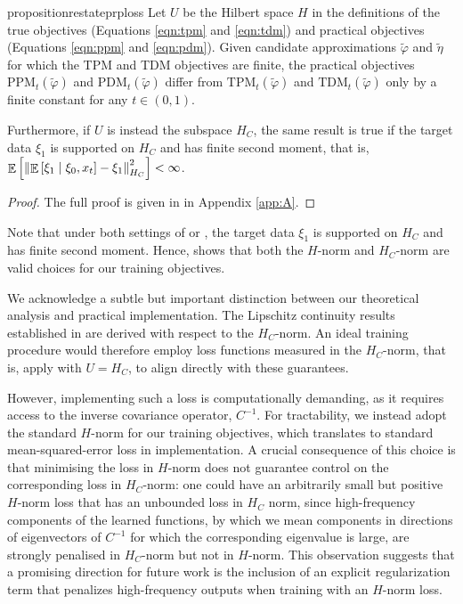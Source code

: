 \begin{restatable}{proposition}{restateprploss}\label{prp:loss}
  Let \(U\) be the Hilbert space \(H\) in the definitions of the true objectives (Equations \ref{eqn:tpm} and \ref{eqn:tdm}) and practical objectives (Equations \ref{eqn:ppm} and \ref{eqn:pdm}). Given candidate approximations \(\widetilde{\varphi}\) and \(\widetilde{\eta}\) for which the TPM and TDM objectives are finite, the practical objectives \(\mathrm{PPM}_{t}(\widetilde{\varphi})\) and \(\mathrm{PDM}_{t}(\widetilde{\varphi})\) differ from \(\mathrm{TPM}_{t}(\widetilde{\varphi})\) and \(\mathrm{TDM}_{t}(\widetilde{\varphi})\) only by a finite constant for any \(t \in (0, 1)\).

  Furthermore, if \(U\) is instead the subspace \(H_{C}\), the same result is true if the target data \(\xi_{1}\) is supported on \(H_{C}\) and has finite second moment, that is, \( \mathop{\mathbb{E}}\qty[\norm{\mathop{\mathbb{E}}\qty[\xi_{1} \mid \xi_{0}, x_{t}] - \xi_{1}}_{H_{C}}^{2}] < \infty\).
\end{restatable}
\begin{proof}
  The full proof is given in  in Appendix \ref{app:A}.
\end{proof}


Note that under both settings of  or , the target data \(\xi_{1}\) is supported on \(H_{C}\) and has finite second moment. Hence,  shows that both the \(H\)-norm and \(H_{C}\)-norm are valid choices for our training objectives.

We acknowledge a subtle but important distinction between our theoretical analysis and practical implementation. The Lipschitz continuity results established in  are derived with respect to the \(H_{C}\)-norm. An ideal training procedure would therefore employ loss functions measured in the \(H_{C}\)-norm, that is, apply  with \(U = H_{C}\), to align directly with these guarantees.

However, implementing such a loss is computationally demanding, as it requires access to the inverse covariance operator, \(C^{-1}\). For tractability, we instead adopt the standard \(H\)-norm for our training objectives, which translates to standard mean-squared-error loss in implementation. A crucial consequence of this choice is that minimising the loss in \(H\)-norm does not guarantee control on the corresponding loss in \(H_{C}\)-norm: one could have an arbitrarily small but positive \(H\)-norm loss that has an unbounded loss in \(H_{C}\) norm, since  high-frequency components of the learned functions, by which we mean components in directions of eigenvectors of \(C^{-1}\) for which the corresponding eigenvalue is large, are strongly penalised in \(H_{C}\)-norm  but not in \(H\)-norm. This observation suggests that a promising direction for future work is the inclusion of an explicit regularization term that penalizes high-frequency outputs when training with an \(H\)-norm loss.

